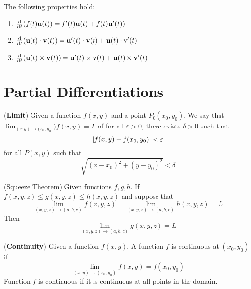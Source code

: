 \documentclass{huhtakm-template-book}
\begin{document}
\begin{lem}
    The following properties hold:
    \begin{enumerate}
        \item $\odv{}{t}(f(t)\mathbf{u}(t))=f'(t)\mathbf{u}(t)+f(t)\mathbf{u}'(t))$
        \item $\odv{}{t}(\mathbf{u}(t)\cdot\mathbf{v}(t))=\mathbf{u}'(t)\cdot\mathbf{v}(t)+\mathbf{u}(t)\cdot\mathbf{v}'(t)$
        \item $\odv{}{t}(\mathbf{u}(t)\times\mathbf{v}(t))=\mathbf{u}'(t)\times\mathbf{v}(t)+\mathbf{u}(t)\times\mathbf{v}'(t)$
    \end{enumerate}
\end{lem}

\chapter{Partial Differentiations}
\begin{defn}(\textbf{Limit})
    Given a function $f(x,y)$ and a point $P_{0}(x_{0},y_{0})$. We say that $\lim_{(x.y)\to(x_{0},y_{0}})f(x,y)=L$ of for all $\varepsilon>0$, there exists $\delta>0$ such that
    \begin{equation*}
        \left|{f(x,y)-f(x_{0},y_{0})}\right|<\varepsilon
    \end{equation*}
    for all $P(x,y)$ such that
    \begin{equation*}
        \sqrt{(x-x_{0})^{2}+(y-y_{0})^{2}}<\delta
    \end{equation*}
\end{defn}
\begin{thm}(Squeeze Theorem)
    Given functions $f,g,h$. If $f(x,y,z)\leq g(x,y,z)\leq h(x,y,z)$ and suppose that
    \begin{equation*}
        \lim_{(x,y,z)\to(a,b,c)}f(x,y,z)=\lim_{(x,y,z)\to(a,b,c)}h(x,y,z)=L
    \end{equation*}
    Then
    \begin{equation*}
        \lim_{(x,y,z)\to(a,b,c)}g(x,y,z)=L
    \end{equation*}
\end{thm}
\begin{defn}(\textbf{Continuity})
    Given a function $f(x,y)$. A function $f$ is continuous at $(x_{0},y_{0})$ if
    \begin{equation*}
        \lim_{(x,y)\to(x_{0},y_{0})}f(x,y)=f(x_{0},y_{0})
    \end{equation*}
    Function $f$ is continuous if it is continuous at all points in the domain. 
\end{defn}
\end{document}
